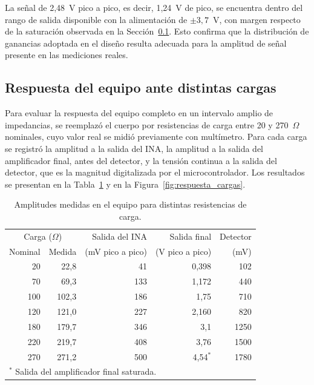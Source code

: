 \documentclass[12pt,a4paper]{article}
\begin{document}
La señal de 2,48~V pico a pico, es decir, 1,24~V de pico, se encuentra dentro del rango de salida
disponible con la alimentación de $\pm3{,}7$~V, con margen respecto de la saturación observada
en la Sección~\ref{sec:respuesta_cargas}. Esto confirma que la distribución de ganancias adoptada
en el diseño resulta adecuada para la amplitud de señal presente en las mediciones reales.

\subsection{Respuesta del equipo ante distintas cargas}
\label{sec:respuesta_cargas}

Para evaluar la respuesta del equipo completo en un intervalo amplio de impedancias, se
reemplazó el cuerpo por resistencias de carga entre 20 y 270~$\Omega$ nominales, cuyo valor
real se midió previamente con multímetro. Para cada carga se registró la amplitud a la salida
del INA, la amplitud a la salida del amplificador final, antes del detector, y la tensión
continua a la salida del detector, que es la magnitud digitalizada por el microcontrolador.
Los resultados se presentan en la Tabla~\ref{tab:respuesta_cargas} y en la
Figura~\ref{fig:respuesta_cargas}.

\begin{table}[htbp]
    \centering
    \caption{Amplitudes medidas en el equipo para distintas resistencias de carga.}
    \label{tab:respuesta_cargas}
    \begin{tabular}{rrrrr}
        \hline
        \multicolumn{2}{c}{Carga ($\Omega$)} & Salida del INA & Salida final & Detector \\
        Nominal & Medida & (mV pico a pico) & (V pico a pico) & (mV) \\
        \hline
        20  & 22,8  & 41  & 0,398 & 102 \\
        70  & 69,3  & 133 & 1,172 & 440 \\
        100 & 102,3 & 186 & 1,75  & 710 \\
        120 & 121,0 & 227 & 2,160 & 820 \\
        180 & 179,7 & 346 & 3,1   & 1250 \\
        220 & 219,7 & 408 & 3,76  & 1500 \\
        270 & 271,2 & 500 & 4,54$^{*}$ & 1780 \\
        \hline
        \multicolumn{5}{l}{\footnotesize $^{*}$ Salida del amplificador final saturada.}
    \end{tabular}
\end{table}
\end{document}
